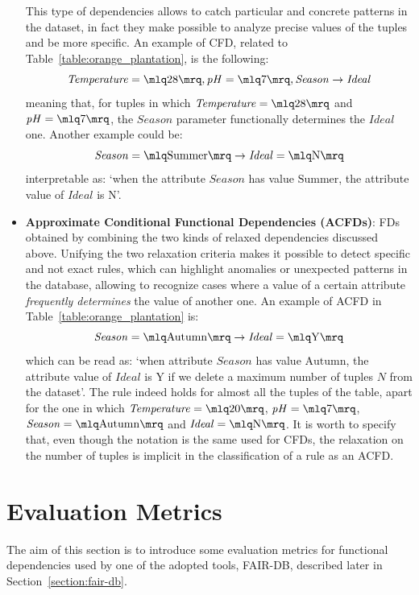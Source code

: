 \begin{itemize}
This type of dependencies allows to catch particular and concrete patterns in the dataset, in fact they make possible to analyze precise values of the tuples and be more specific. An example of CFD, related to Table~\ref{table:orange_plantation}, is the following: \[\mathit{Temperature} = \mlq 28 \mrq, \mathit{pH} = \mlq 7 \mrq, \mathit{Season} \rightarrow \mathit{Ideal}\] meaning that, for tuples in which \(\mathit{Temperature} = \mlq 28 \mrq\) and \(\mathit{pH} = \mlq 7 \mrq\), the \(\mathit{Season}\) parameter functionally determines the \(\mathit{Ideal}\) one. Another example could be: \[\mathit{Season} = \mlq \mathrm{Summer} \mrq \rightarrow \mathit{Ideal} = \mlq \mathrm{N} \mrq\] interpretable as: `when the attribute \(\mathit{Season}\) has value \(\mathrm{Summer}\), the attribute value of \(\mathit{Ideal}\) is \(\mathrm{N}\)'.
\item \textbf{Approximate Conditional Functional Dependencies (ACFDs)}: FDs obtained by combining the two kinds of relaxed dependencies discussed above. Unifying the two relaxation criteria makes it possible to detect specific and not exact rules, which can highlight anomalies or unexpected patterns in the database, allowing to recognize cases where a value of a certain attribute \textit{frequently determines} the value of another one. An example of ACFD in Table~\ref{table:orange_plantation} is: \[\mathit{Season} = \mlq \mathrm{Autumn} \mrq \rightarrow \mathit{Ideal} = \mlq \mathrm{Y} \mrq\] which can be read as: `when attribute \(\mathit{Season}\) has value \(\mathrm{Autumn}\), the attribute value of \(\mathit{Ideal}\) is \(\mathrm{Y}\) if we delete a maximum number of tuples \(N\) from the dataset'. The rule indeed holds for almost all the tuples of the table, apart for the one in which \(\mathit{Temperature} = \mlq 20 \mrq\), \(\mathit{pH} = \mlq 7 \mrq\), \(\mathit{Season} = \mlq \mathrm{Autumn} \mrq\) and \(\mathit{Ideal} = \mlq \mathrm{N} \mrq\). It is worth to specify that, even though the notation is the same used for CFDs, the relaxation on the number of tuples is implicit in the classification of a rule as an ACFD.
\end{itemize}


\section{Evaluation Metrics}
\label{section:evaluation_metrics}
The aim of this section is to introduce some evaluation metrics for functional dependencies used by one of the adopted tools, FAIR-DB, described later in Section~\ref{section:fair-db}.

